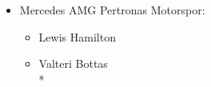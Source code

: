 \documentclass{report}
\begin{document}
\begin{itemize}
\begin{itemize}
\begin{figure}[!h]
\begin{floatrow}
           \end{floatrow}
        \end{figure}
        \end{itemize} 
    \item Mercedes AMG Pertronas Motorspor:
        \begin{itemize}
            \item Lewis Hamilton
            \item Valteri Bottas \\*
        \begin{figure}[!h]
            \begin{floatrow}

\end{floatrow}
\end{figure}
\end{itemize}
\end{itemize}
\end{document}
